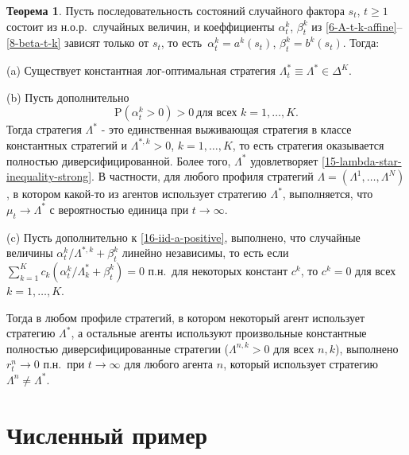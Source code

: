 \documentclass[a4paper,12pt,russian]{article} %
\theoremstyle{definition}
\newtheorem{theorem}{Теорема}
\renewcommand{\P}{\mathrm{P}}
\begin{document}
\begin{theorem}
\label{theorem3-iid}
Пусть последовательность состояний случайного фактора $s_t$, $t\ge1$ состоит из н.о.р.\ случайных величин, и коеффициенты $\alpha_{t}^k$, $\beta_{t}^k$ из \eqref{6-A-t-k-affine}--\eqref{8-beta-t-k} зависят только от $s_t$, то есть\ $\alpha_{t}^k = a^k(s_t)$, $\beta_{t}^k = b^k(s_t)$.
Тогда:

\smallskip
\noindent
(a) Существует константная лог-оптимальная стратегия $\Lambda^*_t \equiv \Lambda^*\in \Delta^K$.

\smallskip
\noindent
(b) Пусть дополнительно
\begin{equation}
\label{16-iid-a-positive}
\P(\alpha_{t}^k > 0) > 0\ \text{для всех $k=1,\dots,K$}.
\end{equation}
Тогда стратегия $\Lambda^*$  - это единственная выживающая стратегия в классе константных стратегий и  $\Lambda^{*,k}>0$, $k=1,\dots,K$, то есть стратегия оказывается полностью диверсифицированной.
Более того, $\Lambda^*$ удовлетворяет  \eqref{15-lambda-star-inequality-strong}.
В частности, для любого профиля стратегий $\Lambda=(\Lambda^1,\dots,\Lambda^N)$, в котором какой-то из агентов использует стратегию $\Lambda^*$, выполняется, что $\mu_t \to \Lambda^*$ с вероятностью единица при $t\to\infty$. 

\smallskip
\noindent
(c) Пусть дополнительно к \eqref{16-iid-a-positive}, выполнено, что случайные величины $\alpha_{t}^k/\Lambda^{*,k} + \beta_{t}^k$ линейно независимы, то есть если $\sum_{k=1}^K c_k(\alpha_{t}^k/\Lambda^*_k + \beta_{t}^k) = 0$ п.н.\ для некоторых констант $c^k$, то $c^k=0$ для всех $k=1,\dots,K$. 

Тогда в любом профиле стратегий, в котором некоторый агент использует стратегию $\Lambda^*$, а остальные агенты используют произвольные константные полностью диверсифицированные стратегии ($\Lambda^{n,k}>0$ для всех $n,k$), выполнено $r_t^n\to0$ п.н.\ при $t\to\infty$ для любого агента $n$, который использует стратегию $\Lambda^n \neq\Lambda^*$.
\end{theorem}






\section{Численный пример}
\label{section4-example}
\end{document}
